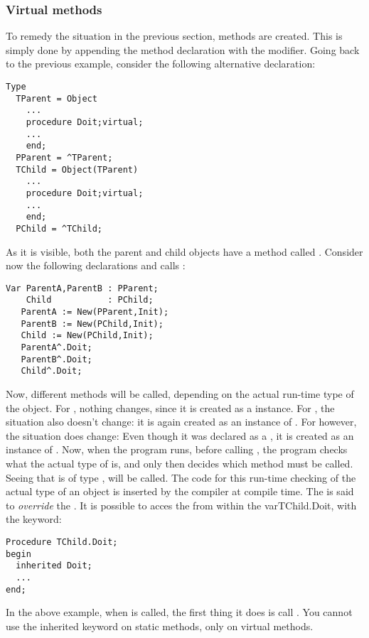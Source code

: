 \documentclass{report}
\begin{document}
\subsubsection{Virtual methods}
To remedy the situation in the previous section,  methods are
created. This is simply done by appending the method declaration with the
 modifier.
Going back to the previous example, consider the following alternative
declaration:
\begin{verbatim}
Type
  TParent = Object
    ...
    procedure Doit;virtual;
    ...
    end;
  PParent = ^TParent;
  TChild = Object(TParent)
    ...
    procedure Doit;virtual;
    ...
    end;
  PChild = ^TChild;
\end{verbatim}
As it is visible, both the parent and child objects have a method called
. Consider now the following declarations and calls :
\begin{verbatim}
Var ParentA,ParentB : PParent;
    Child           : PChild;
   ParentA := New(PParent,Init);
   ParentB := New(PChild,Init);
   Child := New(PChild,Init);
   ParentA^.Doit;
   ParentB^.Doit;
   Child^.Doit;
\end{verbatim}
Now, different methods will be called, depending on the actual run-time type
of the object. For , nothing changes, since it is created as
a  instance. For , the situation also doesn't
change: it is again created as an instance of .
For  however, the situation does change: Even though it was
declared as a , it is created as an instance of .
Now, when the program runs, before calling , the program
checks what the actual type of  is, and only then decides which
method must be called. Seeing that  is of type ,
 will be called.
The code for this run-time checking of the actual type of an object is
inserted by the compiler at compile time.
The  is said to {\em override} the .
It is possible to acces the  from within the
var{TChild.Doit}, with the  keyword:
\begin{verbatim}
Procedure TChild.Doit;
begin
  inherited Doit;
  ...
end;
\end{verbatim}
In the above example, when  is called, the first thing it
does is call . You cannot use the inherited keyword on
static methods, only on virtual methods.
\end{document}

